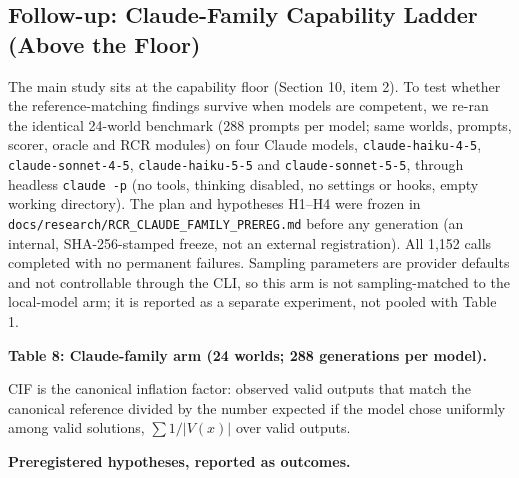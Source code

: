 \documentclass[11pt]{article}
\begin{document}
\subsection{Follow-up: Claude-Family Capability Ladder (Above the Floor)}
The main study sits at the capability floor (Section 10, item 2). To test whether the reference-matching findings survive when models are competent, we re-ran the identical 24-world benchmark (288 prompts per model; same worlds, prompts, scorer, oracle and RCR modules) on four Claude models, \texttt{claude-haiku-4-5}, \texttt{claude-sonnet-4-5}, \texttt{claude-haiku-5-5} and \texttt{claude-sonnet-5-5}, through headless \texttt{claude -p} (no tools, thinking disabled, no settings or hooks, empty working directory). The plan and hypotheses H1--H4 were frozen in \texttt{docs/research/RCR\_CLAUDE\_FAMILY\_PREREG.md} before any generation (an internal, SHA-256-stamped freeze, not an external registration). All 1,152 calls completed with no permanent failures. Sampling parameters are provider defaults and not controllable through the CLI, so this arm is not sampling-matched to the local-model arm; it is reported as a separate experiment, not pooled with Table 1.

\textbf{Table 8: Claude-family arm (24 worlds; 288 generations per model).}

\begin{table}[htbp]
\centering
\footnotesize
\setlength{\tabcolsep}{3pt}
\end{table}
CIF is the canonical inflation factor: observed valid outputs that match the canonical reference divided by the number expected if the model chose uniformly among valid solutions, $\sum 1/|V(x)|$ over valid outputs.

\textbf{Preregistered hypotheses, reported as outcomes.}
\end{document}
